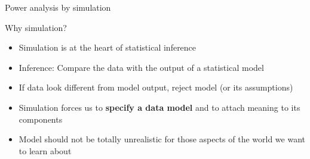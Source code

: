 \documentclass[aspectratio=169]{beamer}
\begin{document}
\begin{frame}{Power analysis by simulation}

Why simulation?\\[1ex]
\begin{itemize}
\item Simulation is at the heart of statistical inference

\item Inference: Compare the data with the output of a statistical model

\item If data look different from model output, reject model (or its
assumptions)

\item Simulation forces us to {\bf specify a data model} and to attach
  meaning to its components

\item Model should not be totally unrealistic for those aspects of the world
we want to learn about
\end{itemize}

\end{frame}

\end{document}
